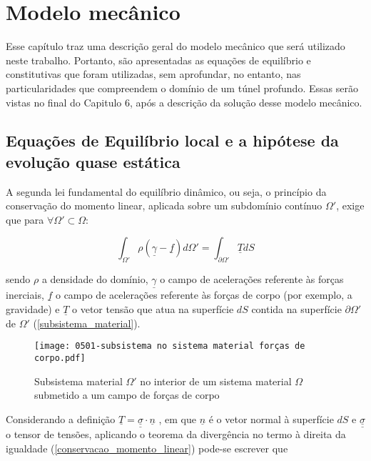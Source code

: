 \chapter{Modelo mecânico}

Esse capítulo traz uma descrição geral do modelo mecânico que será utilizado neste trabalho. Portanto, são apresentadas as equações de equilíbrio e constitutivas que foram utilizadas, sem aprofundar, no entanto, nas particularidades que compreendem o domínio de um túnel profundo. Essas serão vistas no final do Capitulo 6, após a descrição da solução desse modelo mecânico. 

\section{Equações de Equilíbrio local e a hipótese da evolução quase estática}

A segunda lei fundamental do equilíbrio dinâmico, ou seja, o princípio da conservação do momento linear, aplicada sobre um subdomínio contínuo $\Omega'$, exige que para $\forall \Omega' \subset \Omega$:

\begin{equation}
	\label{conservacao_momento_linear}
\int_{\Omega'}\rho(\underline\gamma-\underline f)d\Omega' = \int_{\partial\Omega'}\underline T dS
\end{equation}

sendo $\rho$ a densidade do domínio, $\underline\gamma$ o campo de acelerações referente às forças inerciais, $\underline f$ o campo de acelerações referente às forças de corpo (por exemplo, a gravidade) e $\underline T$ o vetor tensão que atua na superfície $dS$ contida na superfície $\partial\Omega'$ de $\Omega'$ (\autoref{subsistema_material}).
%
\begin{figure}[H]
	\begin{center}
		\texttt{[image: 0501-subsistema no sistema material forças de corpo.pdf]}
	\end{center}
	\caption{\label{subsistema_material}Subsistema material $\Omega'$ no interior de um sistema material $\Omega$ submetido a um campo de forças de corpo}
\end{figure}

Considerando a definição $\underline T = \underline{\underline\sigma}\cdot \underline n$ , em que $\underline n$ é o vetor normal à superfície $dS$ e $\underline{\underline\sigma}$ o tensor de tensões, aplicando o teorema da divergência no termo à direita da igualdade (\autoref{conservacao_momento_linear}) pode-se escrever que

